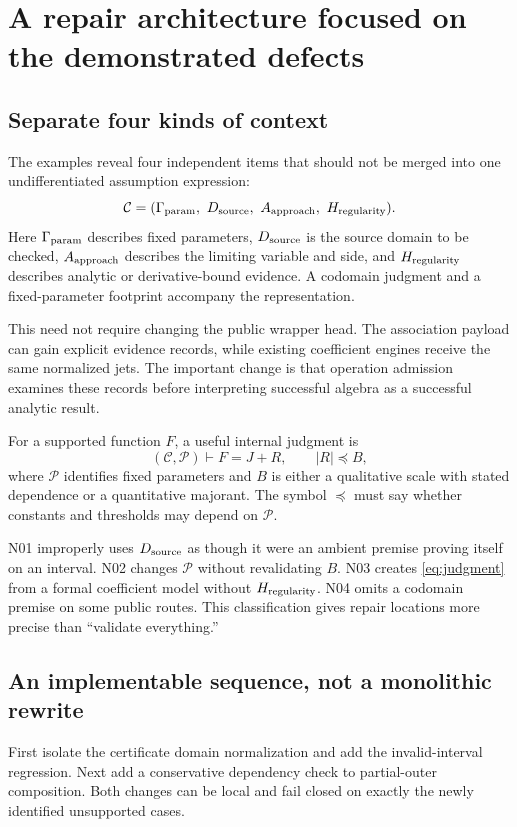 \documentclass[11pt,letterpaper]{article}
\begin{document}
\section{A repair architecture focused on the demonstrated defects}
\subsection{Separate four kinds of context}
The examples reveal four independent items that should not be merged into one undifferentiated assumption expression:
\begin{equation}
 \mathcal C=(\Gamma_{\rm param},\ D_{\rm source},\ A_{\rm approach},\ H_{\rm regularity}).
\end{equation}
Here $\Gamma_{\rm param}$ describes fixed parameters, $D_{\rm source}$ is the source domain to be checked, $A_{\rm approach}$ describes the limiting variable and side, and $H_{\rm regularity}$ describes analytic or derivative-bound evidence. A codomain judgment and a fixed-parameter footprint accompany the representation.

This need not require changing the public wrapper head. The association payload can gain explicit evidence records, while existing coefficient engines receive the same normalized jets. The important change is that operation admission examines these records before interpreting successful algebra as a successful analytic result.

For a supported function $F$, a useful internal judgment is
\begin{equation}\label{eq:judgment}
 (\mathcal C,\mathcal P)\vdash F=J+R,\qquad |R|\preceq B,
\end{equation}
where $\mathcal P$ identifies fixed parameters and $B$ is either a qualitative scale with stated dependence or a quantitative majorant. The symbol $\preceq$ must say whether constants and thresholds may depend on $\mathcal P$.

N01 improperly uses $D_{\rm source}$ as though it were an ambient premise proving itself on an interval. N02 changes $\mathcal P$ without revalidating $B$. N03 creates \eqref{eq:judgment} from a formal coefficient model without $H_{\rm regularity}$. N04 omits a codomain premise on some public routes. This classification gives repair locations more precise than ``validate everything.''

\subsection{An implementable sequence, not a monolithic rewrite}
First isolate the certificate domain normalization and add the invalid-interval regression. Next add a conservative dependency check to partial-outer composition. Both changes can be local and fail closed on exactly the newly identified unsupported cases.
\end{document}
